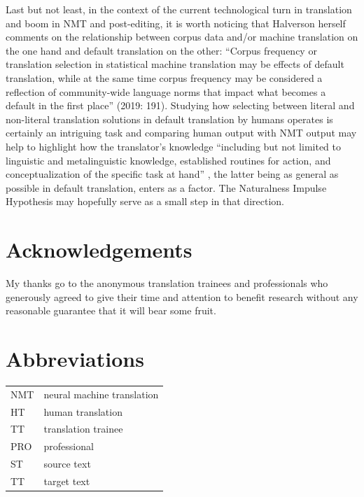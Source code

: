 \documentclass[output=paper]{langscibook}
\begin{document}
Last but not least, in the context of the current technological turn in translation and boom in NMT and post-editing, it is worth noticing that Halverson herself comments on the relationship between corpus data and/or machine translation on the one hand and default translation on the other: “Corpus frequency or translation selection in statistical machine translation may be effects of default translation, while at the same time corpus frequency may be considered a reflection of community-wide language norms that impact what becomes a default in the first place” (2019: 191). Studying how selecting between literal and non-literal translation solutions in default translation by humans operates is certainly an intriguing task and comparing human output with NMT output may help to highlight how the translator’s knowledge “including but not limited to linguistic and metalinguistic knowledge, established routines for action, and conceptualization of the specific task at hand” \citep[191]{Halverson2019}, the latter being as general as possible in default translation, enters as a factor. The Naturalness Impulse Hypothesis may hopefully serve as a small step in that direction.

\section*{Acknowledgements}

My thanks go to the anonymous translation trainees and professionals who generously agreed to give their time and attention to benefit research without any reasonable guarantee that it will bear some fruit.

\section*{Abbreviations}

\begin{tabularx}{\textwidth}{lX}
NMT & neural machine translation\\
HT & human translation\\
TT & translation trainee\\
PRO & professional\\
ST & source text\\
TT & target text\\
\end{tabularx}

\sloppy\printbibliography[heading=subbibliography,notkeyword=this]
\end{document}
